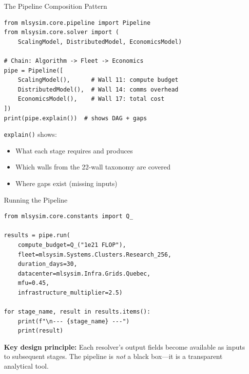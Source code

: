 \documentclass[aspectratio=169, 12pt]{beamer}
\begin{document}
\begin{frame}[fragile]{The Pipeline Composition Pattern}
\begin{lstlisting}
from mlsysim.core.pipeline import Pipeline
from mlsysim.core.solver import (
    ScalingModel, DistributedModel, EconomicsModel)

# Chain: Algorithm -> Fleet -> Economics
pipe = Pipeline([
    ScalingModel(),      # Wall 11: compute budget
    DistributedModel(),  # Wall 14: comms overhead
    EconomicsModel(),    # Wall 17: total cost
])
print(pipe.explain())  # shows DAG + gaps
\end{lstlisting}

\vspace{0.5em}
\texttt{explain()} shows:
\begin{itemize}
  \item What each stage requires and produces
  \item Which walls from the 22-wall taxonomy are covered
  \item Where gaps exist (missing inputs)
\end{itemize}
\end{frame}

\begin{frame}[fragile]{Running the Pipeline}
\begin{lstlisting}
from mlsysim.core.constants import Q_

results = pipe.run(
    compute_budget=Q_("1e21 FLOP"),
    fleet=mlsysim.Systems.Clusters.Research_256,
    duration_days=30,
    datacenter=mlsysim.Infra.Grids.Quebec,
    mfu=0.45,
    infrastructure_multiplier=2.5)

for stage_name, result in results.items():
    print(f"\n--- {stage_name} ---")
    print(result)
\end{lstlisting}

\vspace{0.5em}
\textbf{Key design principle:} Each resolver's output fields become available
as inputs to subsequent stages. The pipeline is \emph{not} a black box---it
is a transparent analytical tool.
\end{frame}
\end{document}
